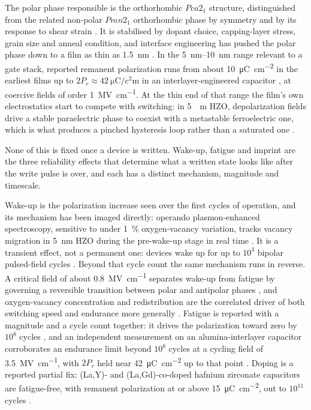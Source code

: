 The polar phase responsible is the orthorhombic $Pca2_1$ structure, distinguished from
the related non-polar $Pmn2_1$ orthorhombic phase by symmetry and by its response to
shear strain \cite{Chen2023_APL}. It is stabilised by dopant choice, capping-layer stress,
grain size and anneal condition, and interface engineering has pushed the polar phase down
to a film as thin as \SI{1.5}{\nano\metre} \cite{Shi2023_NatCommun}. In the
\SIrange{5}{10}{\nano\metre} range relevant to a gate stack, reported remanent
polarization runs from about \SI{10}{\micro\coulomb\per\square\centi\metre} in the
earliest films \cite{Boescke2011_APL} up to $2P_r\approx\SI{42}{\micro\coulomb\per\square
\centi\metre}$ in an interlayer-engineered capacitor \cite{Hsain2023_Nanotechnology}, at
coercive fields of order \SI{1}{\mega\volt\per\centi\metre}. At the thin end of that
range the film's own electrostatics start to compete with switching: in \SI{5}{\nano
\metre} HZO, depolarization fields drive a stable paraelectric phase to coexist with a
metastable ferroelectric one, which is what produces a pinched hysteresis loop rather than
a saturated one \cite{Siannas2022_CommPhys}.

None of this is fixed once a device is written. Wake-up, fatigue and imprint are the
three reliability effects that determine what a written state looks like after the write
pulse is over, and each has a distinct mechanism, magnitude and timescale.

Wake-up is the polarization increase seen over the first cycles of operation, and its
mechanism has been imaged directly: operando plasmon-enhanced spectroscopy, sensitive to
under \SI{1}{\percent} oxygen-vacancy variation, tracks vacancy migration in
\SI{5}{\nano\metre} HZO during the pre-wake-up stage in real time \cite{Jan2023_AFM}. It
is a transient effect, not a permanent one: devices wake up for up to $10^3$ bipolar
pulsed-field cycles \cite{Fields2021_JAP}. Beyond that cycle count the same mechanism
runs in reverse. A critical field of about \SI{0.8}{\mega\volt\per\centi\metre} separates
wake-up from fatigue by governing a reversible transition between polar and antipolar
phases \cite{Cheng2022_NatCommun}, and oxygen-vacancy concentration and redistribution
are the correlated driver of both switching speed and endurance more generally
\cite{Lee2023_NanoConvergence}. Fatigue is reported with a magnitude and a cycle count
together: it drives the polarization toward zero
by $10^8$ cycles \cite{Fields2021_JAP}, and an independent measurement on an
alumina-interlayer capacitor corroborates an endurance limit beyond $10^8$ cycles at a
cycling field of \SI{3.5}{\mega\volt\per\centi\metre}, with $2P_r$ held near
\SI{42}{\micro\coulomb\per\square\centi\metre} up to that point
\cite{Hsain2023_Nanotechnology}. Doping is a reported partial fix: (La,Y)- and
(La,Gd)-co-doped hafnium zirconate capacitors are fatigue-free, with remanent
polarization at or above \SI{15}{\micro\coulomb\per\square\centi\metre}, out to $10^{11}$
cycles \cite{Popovici2022_ACSAEM}.

